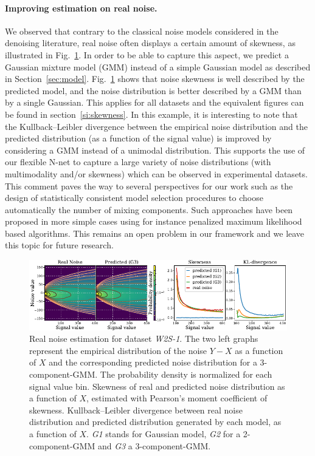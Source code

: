 \documentclass{article}
\begin{document}
\label{sec:exp:real:noise}
\paragraph{Improving estimation on real noise.}
We observed that contrary to the classical noise models considered in the denoising literature, real noise often displays a certain amount of skewness, as illustrated in Fig.~\ref{fig:skewness}.
In order to be able to capture this aspect, we predict a Gaussian mixture model (GMM) instead of a simple Gaussian model as described in Section~\ref{sec:model}. Fig.~\ref{fig:skewness} shows that noise skewness is well described by the predicted model, and the noise distribution is better described by a GMM than by a single Gaussian.
This applies for all datasets and the equivalent figures can be found in section~\ref{si:skewness}.
In this example, it is interesting to note that the Kullback–Leibler divergence between the empirical noise distribution and the predicted distribution (as a function of the signal value) is improved by considering a GMM instead of a unimodal distribution.
This supports the use of our flexible N-net to capture a large variety of noise distributions (with multimodality and/or skewness) which can be observed in experimental datasets.
This comment paves the way to several perspectives for our work such as the design of statistically consistent model selection procedures to choose automatically the number of mixing components.
Such approaches have been proposed in more simple cases using for instance penalized maximum likelihood based algorithms.
This remains an open problem in our framework and we leave this topic for future research.
\begin{figure}[!htbp]
\vskip -0.1in
\begin{center}
\centerline{\includegraphics[width=\textwidth]{fig_skewness_1col_w2s-1.pdf}}
\caption{Real noise estimation for dataset \textit{W2S-1}.
The two left graphs represent the empirical distribution of the noise $Y - X$ as a function of $X$ and the corresponding predicted noise distribution for a 3-component-GMM.
The probability density is normalized for each signal value bin.
Skewness of real and predicted noise distribution as a function of $X$, estimated with Pearson's moment coefficient of skewness.
Kullback–Leibler divergence between real noise distribution and predicted distribution generated by each model, as a function of $X$.
\textit{G1} stands for Gaussian model, \textit{G2} for a 2-component-GMM and \textit{G3} a 3-component-GMM.
}
\label{fig:skewness}
\end{center}
\end{figure}
\end{document}
